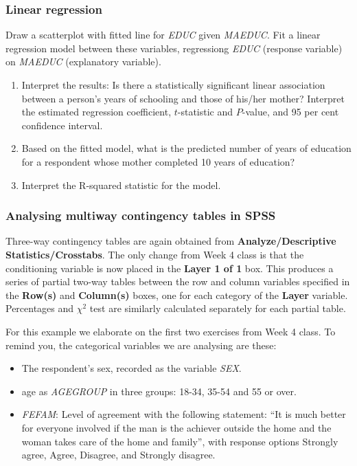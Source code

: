 \subsubsection{Linear regression}
Draw a scatterplot with fitted line
for \emph{EDUC} given \emph{MAEDUC}.
Fit a linear regression
model between these variables, regressiong \emph{EDUC} (response variable)
on \emph{MAEDUC} (explanatory variable).
\begin{enumerate}
\vspace*{-1ex}
\item
Interpret the results: Is there a statistically significant linear association between
a person's years of schooling and those of his/her mother? Interpret the estimated
regression coefficient, $t$-statistic and
$P$-value, and 95 per cent confidence interval.
\item
Based on the fitted model, what is the predicted number of years of education for
a respondent whose mother completed 10 years of education?
\item
Interpret the R-squared statistic for the model.
\end{enumerate}

\subsubsection{Analysing multiway contingency tables in SPSS}

Three-way contingency tables are again obtained from
\textbf{Analyze/Descriptive Statistics/Crosstabs}. The only change
from Week 4 class is that the conditioning variable is now placed in
the \textbf{Layer 1 of 1} box. This produces a series of partial two-way
tables between the row and column variables specified in the
\textbf{Row(s)} and \textbf{Column(s)} boxes, one for each category of
the \textbf{Layer} variable. Percentages and $\chi^{2}$ test are similarly
calculated separately for each partial table.

For this example we elaborate on the first two exercises from Week 4 class. To remind
you, the categorical variables we are analysing are these:
\begin{itemize}
\item
The respondent's sex, recorded as the variable \emph{SEX}.
\item
age as \emph{AGEGROUP} in three groups: 18-34, 35-54 and 55 or over.
\item
\emph{FEFAM}: Level of agreement with the following statement: ``It is much better for
everyone involved if the man is the achiever outside the home and the woman takes care
of the home and family'', with response options Strongly agree, Agree,
Disagree, and Strongly disagree.
\end{itemize}

